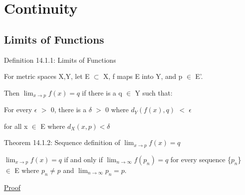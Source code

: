 \newpage

\section[Day 14: Continuity]{Continuity}

\subsection{ Limits of Functions }

{ \color{blue} Definition 14.1.1: Limits of Functions }

    \begin{adjustbox}{minipage=14cm, right, vspace=0.1cm 0cm}
        For metric spaces X,Y, let E $\subset$ X, f maps E into Y,
        and p $\in$ E'.
        
        Then $\lim_{x \rightarrow p} f(x) = q$
        if there is a q $\in$ Y such that:
        
        \begin{adjustbox}{minipage=13cm, right, vspace=0.1cm 0cm}
            For every $\epsilon$ $>$ 0,
            there is a $\delta$ $>$ 0 where $d_Y(f(x),q)$ $<$ $\epsilon$
            
            for all x $\in$ E where $d_X(x,p) < \delta$
        \end{adjustbox}
    \end{adjustbox}

    \vspace{0.5cm}

{ \color{red} Theorem 14.1.2:
Sequence definition of $\lim_{x \rightarrow p} f(x) = q$ }

    \begin{adjustbox}{minipage=14cm, right, vspace=0.1cm 0cm}
        $\lim_{x \rightarrow p} f(x) = q$ if and only if
        $\lim_{n \rightarrow \infty} f(p_n) = q$ for every
        sequence \{$p_n$\} $\in$ E where $p_n \not = p$ and
        $\lim_{n \rightarrow \infty} p_n = p$.
    \end{adjustbox}

{ \color{magenta} \underline{Proof} }

